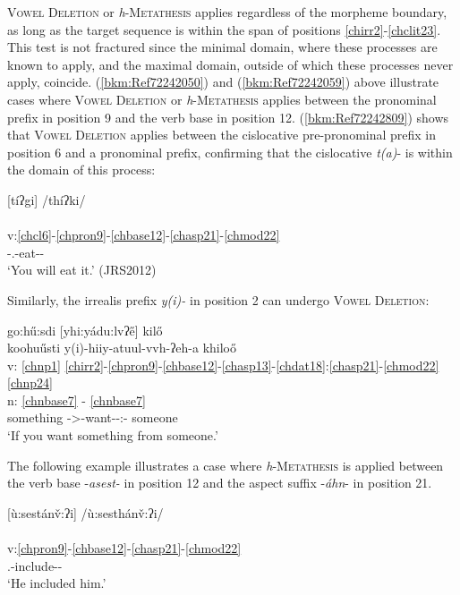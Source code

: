 \documentclass[output=paper]{langscibook}
\begin{document}
\textsc{Vowel} \textsc{Deletion} or \textit{h}{}-\textsc{Metathesis} applies regardless of the morpheme boundary, as long as the target sequence is within the span of positions \ref{chirr2}-\ref{chclit23}. This test is not fractured since the minimal domain, where these processes are known to apply, and the maximal domain, outside of which these processes never apply, coincide. (\ref{bkm:Ref72242050}) and (\ref{bkm:Ref72242059}) above illustrate cases where \textsc{Vowel} \textsc{Deletion} or \textit{h}{}-\textsc{Metathesis} applies between the pronominal prefix in position 9 and the verb base in position 12. (\ref{bkm:Ref72242809}) shows that \textsc{Vowel} \textsc{Deletion} applies between the cislocative pre-pronominal prefix in position 6 and a pronominal prefix, confirming that the cislocative \textit{t(a)}{}- is within the domain of this process:

\ea\label{bkm:Ref72242809}[tíʔgi] /thíʔki/ \\
\\
v:\ref{chcl6}-\ref{chpron9}-\ref{chbase12}-\ref{chasp21}-\ref{chmod22}\\
\Cisl{}-\Second\Sg.\Aarg{}-eat-\Prf{}-\Mot{}\\
\glt `You will eat it.' (JRS2012)
\z 

Similarly, the irrealis prefix \textit{y(i)-} in position 2 can undergo \textsc{Vowel} \textsc{Deletion}:

\ea\label{ex:cher:key:50} {go:hű:sdi [yhi:yádu:lvʔ\H{e}] kilő} \\
\gllll {} koohuűsti y(i)-hiiy-atuul-vvh-ʔeh-a khiloő \\
v: \ref{chnp1} \ref{chirr2}-\ref{chpron9}-\ref{chbase12}-\ref{chasp13}-\ref{chdat18}:\ref{chasp21}-\ref{chmod22} \ref{chnp24}\\
n: \ref{chnbase7} - \ref{chnbase7}\\  
{} something \Irr{}-\Second\Sg>\An{}-want-\Prf{}-\Dat:\Prs{}-\Ind{} someone\\
\glt `If you want something from someone.' \citep{Montgomery-Anderson2015}
\z 

The following example illustrates a case where \textit{h}{}-\textsc{Metathesis} is applied between the verb base -\textit{asest-} in position 12 and the aspect suffix -\textit{áhn}{}- in position 21.

\ea\label{ex:cher:key:51} {[ù:sestán\v{v}:ʔi] /ù:sesthán\v{v}:ʔi/} \\
\\
v:\ref{chpron9}-\ref{chbase12}-\ref{chasp21}-\ref{chmod22}\\
\Third\Sg.\Barg{}-include-\Prf{}-\Ind{}\\ 
\glt `He included him.' \citep[49]{Feeling1975}
\z 
\end{document}
